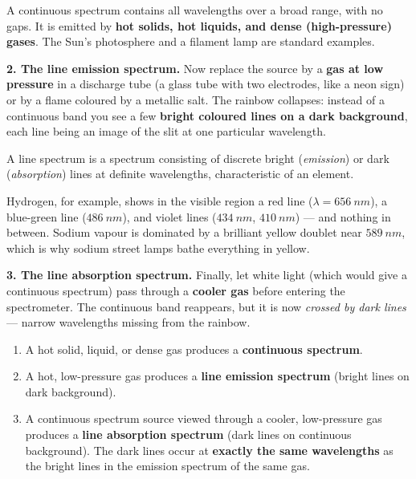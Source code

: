 \documentclass[11pt]{article}
\newcommand{\cle}[1]{{\popxbold\color{popdark}#1}}
\begin{document}
\begin{definition}
A \cle{continuous spectrum} contains all wavelengths over a broad range, with no gaps. It is emitted by \textbf{hot solids, hot liquids, and dense (high-pressure) gases}. The Sun's photosphere and a filament lamp are standard examples.
\end{definition}

\textbf{2. The line emission spectrum.} Now replace the source by a \textbf{gas at low pressure} in a discharge tube (a glass tube with two electrodes, like a neon sign) or by a flame coloured by a metallic salt. The rainbow collapses: instead of a continuous band you see a few \textbf{bright coloured lines on a dark background}, each line being an image of the slit at one particular wavelength.

\begin{definition}
A \cle{line spectrum} is a spectrum consisting of discrete bright (\emph{emission}) or dark (\emph{absorption}) lines at definite wavelengths, characteristic of an element.
\end{definition}

Hydrogen, for example, shows in the visible region a red line ($\lambda = \SI{656}{nm}$), a blue-green line ($\SI{486}{nm}$), and violet lines ($\SI{434}{nm}$, $\SI{410}{nm}$) — and nothing in between. Sodium vapour is dominated by a brilliant yellow doublet near $\SI{589}{nm}$, which is why sodium street lamps bathe everything in yellow.

\textbf{3. The line absorption spectrum.} Finally, let white light (which would give a continuous spectrum) pass through a \textbf{cooler gas} before entering the spectrometer. The continuous band reappears, but it is now \emph{crossed by dark lines} — narrow wavelengths missing from the rainbow.

\begin{propriete}
\begin{enumerate}
\item A hot solid, liquid, or dense gas produces a \textbf{continuous spectrum}.
\item A hot, low-pressure gas produces a \textbf{line emission spectrum} (bright lines on dark background).
\item A continuous spectrum source viewed through a cooler, low-pressure gas produces a \textbf{line absorption spectrum} (dark lines on continuous background). The dark lines occur at \textbf{exactly the same wavelengths} as the bright lines in the emission spectrum of the same gas.
\end{enumerate}
\end{propriete}
\end{document}
